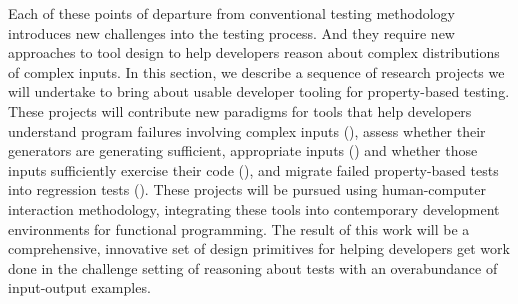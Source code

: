Each of these points of departure from conventional testing methodology
introduces new challenges into the testing process. And they require new
approaches to tool design to help developers reason about complex distributions
of complex inputs. In this section, we describe a sequence of research projects
we will undertake to bring about usable developer tooling for property-based
testing. These projects will contribute new paradigms for tools that help
developers understand program failures involving complex inputs
(), assess whether their generators are generating
sufficient, appropriate inputs () and
whether those inputs sufficiently exercise their code
(), and migrate failed property-based tests into regression
tests ().
These projects will be pursued
using human-computer interaction methodology, integrating these tools into
contemporary development environments for functional programming. The result of
this work will be a comprehensive, innovative set of design primitives for
helping developers get work done in the challenge setting of reasoning about
tests with an overabundance of input-output examples.




